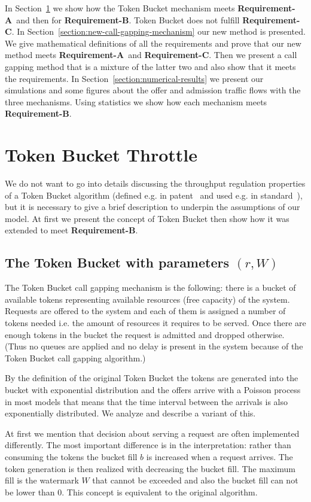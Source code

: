 \documentclass[conference]{IEEEtran}
\newcommand{\reqA}{\textbf{Requirement-A}}
\newcommand{\reqB}{\textbf{Requirement-B}}
\newcommand{\reqC}{\textbf{Requirement-C}}
\begin{document}
In Section~\ref{section:token-bucket-throttle} we show how the Token
Bucket mechanism meets \reqA\ and then for \reqB. Token Bucket does
not fulfill \reqC. In
Section~\ref{section:new-call-gapping-mechanism} our new method is
presented. We give mathematical definitions of all the requirements
and prove that our new method meets \reqA\ and \reqC. Then we
present a call gapping method that is a mixture of the latter two
and also show that it meets the requirements. In
Section~\ref{section:numerical-results} we present our simulations
and some figures about the offer and admission traffic flows with
the three mechanisms. Using statistics we show how each mechanism
meets \reqB.

\section{Token Bucket Throttle}\label{section:token-bucket-throttle}
We do not want to go into details discussing the throughput
regulation properties of a Token Bucket algorithm (defined e.g. in
patent~\cite{TBLBW} and used e.g. in standard~\cite{H.248.11}), but
it is necessary to give a brief description to underpin the
assumptions of our model. At first we present the concept of Token
Bucket then show how it was extended to meet \reqB.

\subsection{The Token Bucket with parameters $(r,W)$}
The Token Bucket call gapping mechanism is the following: there is a
bucket of available tokens representing available resources (free
capacity) of the system. Requests are offered to the system and each
of them is assigned a number of tokens needed i.e. the amount of
resources it requires to be served. Once there are enough tokens in
the bucket the request is admitted and dropped otherwise. (Thus no
queues are applied and no delay is present in the system because of
the Token Bucket call gapping algorithm.)

By the definition of the original Token Bucket the tokens are
generated into the bucket with exponential distribution and the
offers arrive with a Poisson process in most models that means that
the time interval between the arrivals is also exponentially
distributed. We analyze and describe a variant of this.

At first we mention that decision about serving a request are often
implemented differently. The most important difference is in the
interpretation: rather than consuming the tokens the bucket fill $b$
is increased when a request arrives. The token generation is then
realized with decreasing the bucket fill. The maximum fill is the
watermark $W$ that cannot be exceeded and also the bucket fill can
not be lower than 0. This concept is equivalent to the original
algorithm.
\end{document}
